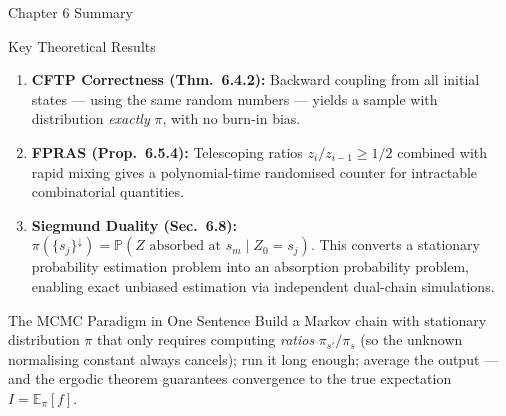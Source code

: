 \documentclass[aspectratio=169,10pt]{beamer}
\newcommand{\PP}{\mathbb{P}}
\newcommand{\EE}{\mathbb{E}}
\begin{document}
\begin{frame}[allowframebreaks]{Chapter 6 Summary}
\begin{block}{Key Theoretical Results}
\begin{enumerate}
  \item \textbf{CFTP Correctness (Thm.~6.4.2):} Backward coupling from all initial states --- using the same random numbers --- yields a sample with distribution \emph{exactly} $\pi$, with no burn-in bias.

  \item \textbf{FPRAS (Prop.~6.5.4):} Telescoping ratios $z_i/z_{i-1} \ge 1/2$ combined with rapid mixing gives a polynomial-time randomised counter for intractable combinatorial quantities.

  \item \textbf{Siegmund Duality (Sec.~6.8):} $\pi(\{s_j\}^\downarrow) = \PP(Z \text{ absorbed at } s_m \mid Z_0 = s_j)$.
  This converts a stationary probability estimation problem into an absorption probability problem, enabling exact unbiased estimation via independent dual-chain simulations.
\end{enumerate}
\end{block}

\begin{alertblock}{The MCMC Paradigm in One Sentence}
Build a Markov chain with stationary distribution $\pi$ that only requires computing \emph{ratios} $\pi_{s'}/\pi_s$ (so the unknown normalising constant always cancels); run it long enough; average the output --- and the ergodic theorem guarantees convergence to the true expectation $I = \EE_\pi[f]$.
\end{alertblock}

\end{frame}
\end{document}
